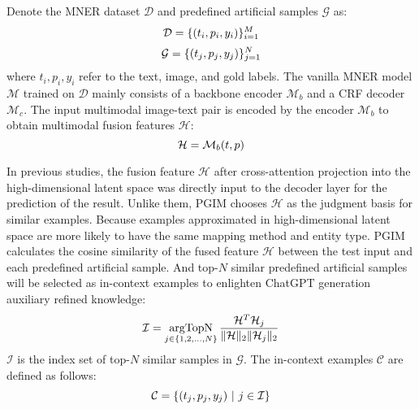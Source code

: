 \documentclass[11pt]{article}
\begin{document}
Denote the MNER dataset $\mathcal{D}$ and predefined artificial samples $\mathcal{G}$ as:
\vspace{-3pt}
\begin{equation}
    \mathcal{D}=\{(t_i, p_i, y_i)\}_{i=1}^M \nonumber
    \vspace{-3pt}
\end{equation}
\begin{equation}
    \mathcal{G}=\{(t_j, p_j, y_j)\}_{j=1}^N \nonumber
    \vspace{-3pt}
\end{equation}
where $t_i, p_i, y_i$ refer to the text, image, and gold labels. The vanilla MNER model $\mathcal{M}$ trained on $\mathcal{D}$ mainly consists of a backbone encoder $\mathcal{M}_{b}$ and a CRF decoder $\mathcal{M}_{c}$. The input multimodal image-text pair is encoded by the encoder $\mathcal{M}_{b}$ to obtain multimodal fusion features $\mathcal{H}$:
\vspace{-3pt}
\begin{equation}
	\mathcal{H} = \mathcal{M}_{b}(t, p) \nonumber
        \vspace{-3pt}
\end{equation}

In previous studies, the fusion feature $\mathcal{H}$ after cross-attention projection into the high-dimensional latent space was directly input to the decoder layer for the prediction of the result. 
Unlike them, PGIM chooses $\mathcal{H}$ as the judgment basis for similar examples. 
Because examples approximated in high-dimensional latent space are more likely to have the same mapping method and entity type. 
PGIM calculates the cosine similarity of the fused feature $\mathcal{H}$ between the test input and each predefined artificial sample. And top-$N$ similar predefined artificial samples will be selected as in-context examples to enlighten ChatGPT generation auxiliary refined knowledge: 
\vspace{-3pt}
\begin{equation}
    \mathcal{I} = \mathop{\text{argTopN}}\limits_{j\in\{1,2,...,N\}} \frac{\mathcal{H}^T\mathcal{H}_j}{\|\mathcal{H}\|_2\|\mathcal{H}_j\|_2}
    \vspace{-3pt}
    \nonumber
\end{equation}
$\mathcal{I}$ is the index set of top-$N$ similar samples in $\mathcal{G}$. The in-context examples $\mathcal{C}$ are defined as follows: 
\vspace{-3pt}
\begin{equation}
    \mathcal{C} = \{(t_{j}, p_{j}, y_{j})\ |\ j\in\mathcal{I}\} \nonumber
    \vspace{-3pt}
\end{equation}
\end{document}
